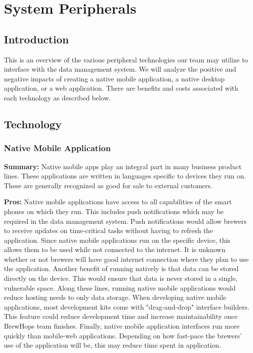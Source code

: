 \documentclass[draftclsnofoot,onecolumn,letterpaper,10pt,compsoc]{IEEEtran}
\begin{document}
		\clearpage

		\section{System Peripherals}
		    \subsection{Introduction}
		        This is an overview of the various peripheral technologies our team may utilize to interface with the data management system.
		        We will analyze the positive and negative impacts of creating a native mobile application, a native desktop application, or a web application.
		        There are benefits and costs associated with each technology as described below.

      \subsection{Technology}
  			\subsubsection{Native Mobile Application}
		        \textbf{Summary:}
		            Native mobile apps play an integral part in many business product lines.
		            These applications are written in languages specific to devices they run on.
		            These are generally recognized as good for sale to external customers\cite{SearchCloudOverview}.

		        \noindent \textbf{Pros:}
		            Native mobile applications have access to all capabilities of the smart phones on which they run.
		            This includes push notifications which may be required in the data management system.
		            Push notifications would allow brewers to receive updates on time-critical tasks without having to refresh the application.
		            Since native mobile applications run on the specific device, this allows them to be used while not connected to the internet.
		            It is unknown whether or not brewers will have good internet connection where they plan to use the application.
		            Another benefit of running natively is that data can be stored directly on the device.
		            This would ensure that data is never stored in a single, vulnerable space.
		            Along these lines, running native mobile applications would reduce hosting needs to only data storage.
		            When developing native mobile applications, most development kits come with "drag-and-drop" interface builders.
		            This feature could reduce development time and increase maintainability once BrewHops team finishes.
		            Finally, native mobile application interfaces run more quickly than mobile-web applications.
		            Depending on how fast-pace the brewers' use of the application will be, this may reduce time spent in application.
\end{document}
